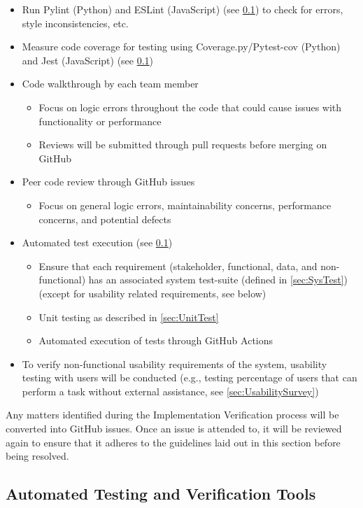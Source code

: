 \documentclass[12pt, titlepage]{article}
\begin{document}
\begin{itemize}
  \item Run Pylint (Python) and ESLint (JavaScript) (see \ref{sec:AutoTestandVerTools}) to check for errors, style inconsistencies, etc.
  \item Measure code coverage for testing using Coverage.py/Pytest-cov (Python) and Jest (JavaScript) (see \ref{sec:AutoTestandVerTools})
  \item Code walkthrough by each team member
  \begin{itemize}
    \item Focus on logic errors throughout the code that could cause issues with functionality or performance
    \item Reviews will be submitted through pull requests before merging on GitHub
  \end{itemize}
  \item Peer code review through GitHub issues
  \begin{itemize}
    \item Focus on general logic errors, maintainability concerns, performance concerns, and potential defects
  \end{itemize}
  \item Automated test execution (see \ref{sec:AutoTestandVerTools})
  \begin{itemize}
    \item Ensure that each requirement (stakeholder, functional, data, and non-functional) has an associated system test-suite (defined in \ref{sec:SysTest}) (except for usability related requirements, see below)
    \item Unit testing as described in \ref{sec:UnitTest}
    \item Automated execution of tests through GitHub Actions
  \end{itemize}
  \item To verify non-functional usability requirements of the system, usability testing with users will be conducted (e.g., testing percentage of users that can perform a task without external assistance, see \ref{sec:UsabilitySurvey})
\end{itemize}

Any matters identified during the Implementation Verification process will be converted into GitHub issues. Once an issue is attended to, it will be reviewed again to ensure that it adheres to the guidelines laid out in this section before being resolved.

\subsection{Automated Testing and Verification Tools}
\label{sec:AutoTestandVerTools}
\end{document}
